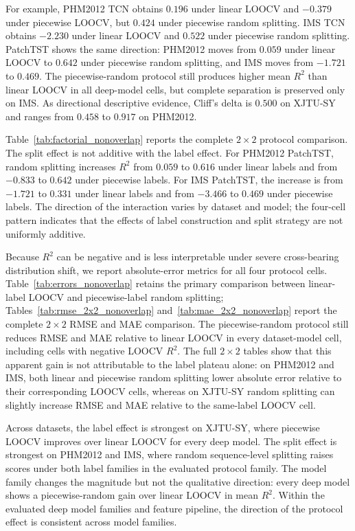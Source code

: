 \documentclass[pdflatex,sn-basic,NameDate]{sn-jnl}
\begin{document}
For example, PHM2012 TCN obtains $0.196$ under linear LOOCV and $-0.379$ under piecewise LOOCV, but $0.424$ under piecewise random splitting. IMS TCN obtains $-2.230$ under linear LOOCV and $0.522$ under piecewise random splitting. PatchTST shows the same direction: PHM2012 moves from $0.059$ under linear LOOCV to $0.642$ under piecewise random splitting, and IMS moves from $-1.721$ to $0.469$. The piecewise-random protocol still produces higher mean $R^2$ than linear LOOCV in all deep-model cells, but complete separation is preserved only on IMS. As directional descriptive evidence, Cliff's delta is $0.500$ on XJTU-SY and ranges from $0.458$ to $0.917$ on PHM2012.



Table~\ref{tab:factorial_nonoverlap} reports the complete $2 \times 2$ protocol comparison. The split effect is not additive with the label effect. For PHM2012 PatchTST, random splitting increases $R^2$ from $0.059$ to $0.616$ under linear labels and from $-0.833$ to $0.642$ under piecewise labels. For IMS PatchTST, the increase is from $-1.721$ to $0.331$ under linear labels and from $-3.466$ to $0.469$ under piecewise labels. The direction of the interaction varies by dataset and model; the four-cell pattern indicates that the effects of label construction and split strategy are not uniformly additive.

Because $R^2$ can be negative and is less interpretable under severe cross-bearing distribution shift, we report absolute-error metrics for all four protocol cells. Table~\ref{tab:errors_nonoverlap} retains the primary comparison between linear-label LOOCV and piecewise-label random splitting; Tables~\ref{tab:rmse_2x2_nonoverlap} and~\ref{tab:mae_2x2_nonoverlap} report the complete $2\times2$ RMSE and MAE comparison. The piecewise-random protocol still reduces RMSE and MAE relative to linear LOOCV in every dataset-model cell, including cells with negative LOOCV $R^2$. The full $2\times2$ tables show that this apparent gain is not attributable to the label plateau alone: on PHM2012 and IMS, both linear and piecewise random splitting lower absolute error relative to their corresponding LOOCV cells, whereas on XJTU-SY random splitting can slightly increase RMSE and MAE relative to the same-label LOOCV cell.

Across datasets, the label effect is strongest on XJTU-SY, where piecewise LOOCV improves over linear LOOCV for every deep model. The split effect is strongest on PHM2012 and IMS, where random sequence-level splitting raises scores under both label families in the evaluated protocol family. The model family changes the magnitude but not the qualitative direction: every deep model shows a piecewise-random gain over linear LOOCV in mean $R^2$. Within the evaluated deep model families and feature pipeline, the direction of the protocol effect is consistent across model families.
\end{document}
